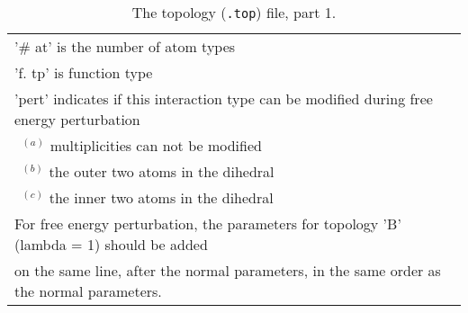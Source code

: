 \begin{table}[p]
{\begin{tabular}{|l|lllll|}
\multicolumn{6}{l}{'\# at' is the number of atom types} \\
\multicolumn{6}{l}{'f. tp' is function type} \\
\multicolumn{6}{l}{'pert' indicates if this interaction type
can be modified during free energy perturbation} \\
\multicolumn{6}{l}{~$^{(a)}$ multiplicities can not be modified} \\
\multicolumn{6}{l}{~$^{(b)}$ the outer two atoms in the dihedral} \\
\multicolumn{6}{l}{~$^{(c)}$ the inner two atoms in the dihedral} \\
\multicolumn{6}{l}{For free energy perturbation, the parameters for topology 'B' (lambda = 1) should be added} \\
\multicolumn{6}{l}{on the same line, after the normal parameters,
in the same order as the normal parameters.} \\
\end{tabular}
}
\caption{The topology ({\tt *.top}) file, part 1.}
\label{ta:topfile1}
\end{table}

